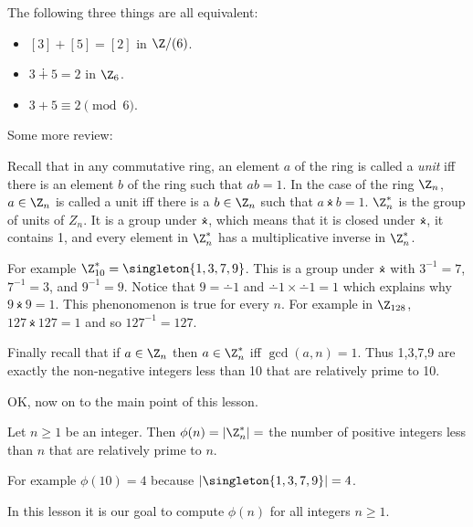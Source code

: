 \documentclass[oneside,12pt]{amsart}
\begin{document}
The following three things are all equivalent:
\begin{itemize}
\item $[3] + [5] = [2]$ in $\Z/(6)$.
\item $3 \dotplus 5 = 2$ in $\Z_6$.
\item $3 + 5 \equiv 2 \pmod 6$.
\end{itemize}

Some more review:

Recall that in any commutative ring, an element $a$ of the ring is called a \emph{unit} iff there is an element
$b$ of the ring such that $ab=1$. In the case of the ring $\Z_n$, $a\in\Z_n$ is called a unit iff there is a
$b\in\Z_n$ such that $a\dottimes b = 1$. $\Z^*_n$ is the group of units of $Z_n$. It is a group under
$\dottimes$, which means that it is closed under $\dottimes$, it contains 1, and every element in
$\Z_n^*$ has a multiplicative inverse in $\Z^*_n$.

For example $\Z^*_{10} = \singleton{1,3,7,9}$. This is a group under $\dottimes$ with
$3^{-1} = 7$,  $7^{-1} = 3$, and $9^{-1} = 9$. Notice that $9 = \dotminus 1$ and $\dotminus 1 \times \dotminus 1 = 1$ which explains why $9\dottimes 9 = 1$. This phenonomenon is true for every $n$. For example
in $\Z_{128}$, $127\dottimes 127 = 1$ and so $127^{-1} = 127$.

Finally recall that if $a\in\Z_n$ then $a\in\Z^*_n$ iff $\gcd(a,n) = 1$. Thus 1,3,7,9 are exactly the
non-negative integers less than 10 that are relatively prime to 10.

OK, now on to the main point of this lesson.

\begin{definition}
Let $n\geq 1$ be an integer. Then $\phi(n) = |\Z_n^*| = $ the number of positive integers less than $n$ that are relatively prime to $n$.
\end{definition}

For example $\phi(10) = 4$ because $|\singleton{1,3,7,9}|=4$.

In this lesson it is our goal to compute $\phi(n)$ for all integers $n\geq 1$.






\end{document}
